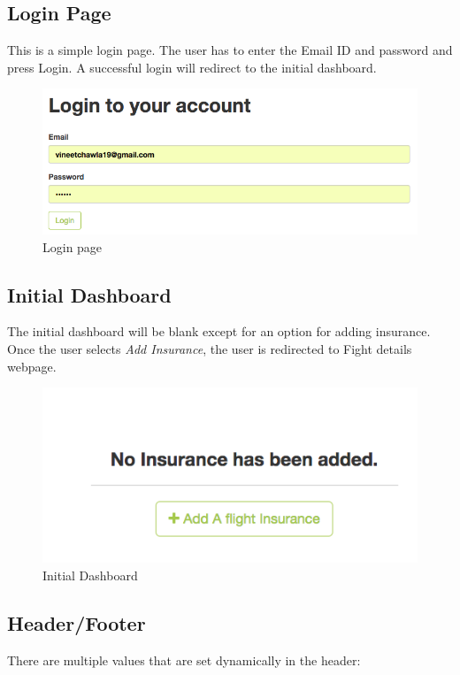\subsection{Login Page}
This is a simple login page. The user has to enter the Email ID and password and press Login. A successful login will redirect to the initial dashboard.
\begin{figure}[h]
    \centering
    \includegraphics[width=\textwidth]{Figures/login_page.png}
    \caption{Login page}
    \label{fig:login_page}
\end{figure}

\subsection{Initial Dashboard}
The initial dashboard will be blank except for an option for adding insurance.
Once the user selects \textit{Add Insurance}, the user is redirected to Fight details webpage.
\begin{figure}[H]
    \centering
    \includegraphics[width=\textwidth]{Figures/init_dashboard.png}
    \caption{Initial Dashboard}
    \label{fig:init_dash}
\end{figure}


\subsection{Header/Footer}
There are multiple values that are set dynamically in the header:


